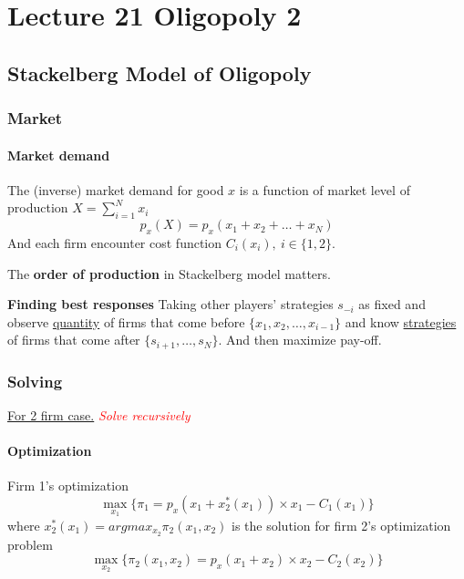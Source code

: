 \documentclass[]{article}
\begin{document}
    \section{Lecture 21 Oligopoly 2}
        \subsection{Stackelberg Model of Oligopoly}
            \subsubsection{Market}
                \paragraph{Market demand} The (inverse) market demand for good $x$ is a function of market level of production $X = \sum_{i=1}^N{x_i}$
                \[
                    p_x(X) = p_x(x_1 + x_2 + \dots + x_N)
                \]
                And each firm encounter cost function $C_i(x_i),\ i \in \{1, 2\}$.
                
                \begin{remark}
                    The \textbf{order of production} in Stackelberg model matters.
                \end{remark}
                
                \begin{remark}
                    \textbf{Finding best responses}
                    Taking other players' strategies $s_{-i}$ as fixed and observe \ul{quantity} of firms that come before $\{x_1, x_2, \dots, x_{i-1}\}$ and know \ul{strategies} of firms that come after $\{s_{i+1}, \dots, s_N\}$. And then maximize pay-off.
                \end{remark}
            
            \subsubsection{Solving}
                \ul{For 2 firm case.} \textcolor{red}{\emph{Solve recursively}}
                \paragraph{Optimization} Firm 1's optimization
                    \[
                        \max_{x_1} \big \{ \pi_1 = p_x (x_1 + x_2^*(x_1)) \times x_1 - C_1(x_1) \big \}
                    \]
                    where $x_2^*(x_1) = argmax_{x_2}\pi_2(x_1, x_2)$ is the solution for firm 2's optimization problem
                    \[
                        \max_{x_2} \big \{ \pi_2 (x_1, x_2) = p_x(x_1 + x_2) \times x_2 - C_2(x_2) \big \}
                    \]
                
\end{document}
